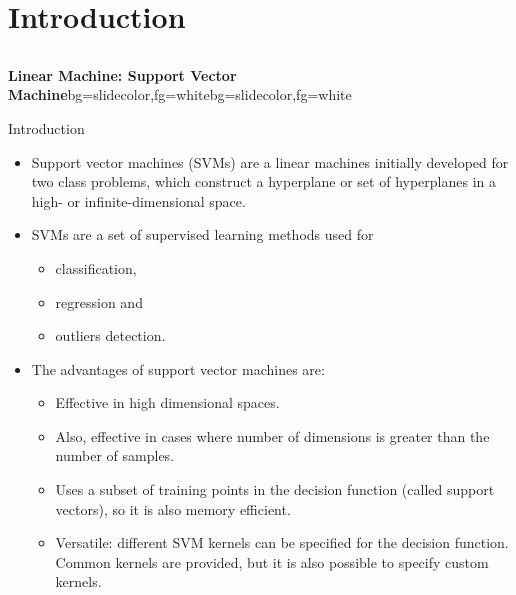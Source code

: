 \section{Introduction}
\subsection{}
\begin{frame}{}
\begin{variableblock}{\centering \Large \textbf{\vspace{4pt}\newline Linear Machine: Support Vector Machine\vspace{4pt}}}{bg=slidecolor,fg=white}{bg=slidecolor,fg=white}
\end{variableblock}
\end{frame}

\begin{frame}{Introduction}
\begin{itemize}
\item Support vector machines (SVMs) are a linear machines initially developed for two class problems, which construct a hyperplane or set of hyperplanes in a high- or infinite-dimensional space.
\item SVMs are a set of supervised learning methods used for 
\begin{itemize}
\item classification, 
\item regression and 
\item outliers detection.
\end{itemize}
\item The advantages of support vector machines are:
\begin{itemize}
\item Effective in high dimensional spaces.
\item Also, effective in cases where number of dimensions is greater than the number of samples.
\item Uses a subset of training points in the decision function (called {\color{mycolor2}support vectors}), so it is also {\color{mycolor1}memory efficient}.
\item Versatile: different SVM kernels can be specified for the decision function. Common kernels are provided, but it is also possible to specify custom kernels.
\end{itemize}
\end{itemize}
\end{frame}



